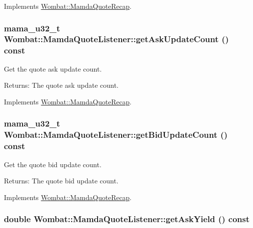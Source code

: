 Implements \hyperlink{classWombat_1_1MamdaQuoteRecap_91a0dbca4e481e0e3179af813128fba9}{Wombat::Mamda\-Quote\-Recap}.\hypertarget{classWombat_1_1MamdaQuoteListener_f1cf490659772cef488d7207b3587958}{
\subsubsection[getAskUpdateCount]{\setlength{\rightskip}{0pt plus 5cm}mama\_\-u32\_\-t Wombat::Mamda\-Quote\-Listener::get\-Ask\-Update\-Count () const}}
\label{classWombat_1_1MamdaQuoteListener_f1cf490659772cef488d7207b3587958}


Get the quote ask update count. 

\begin{Desc}
\item[Returns:]The quote ask update count. \end{Desc}


Implements \hyperlink{classWombat_1_1MamdaQuoteRecap_99ae27dd8ca7ed8507afcc66cdfe0f1c}{Wombat::Mamda\-Quote\-Recap}.\hypertarget{classWombat_1_1MamdaQuoteListener_d9c60e9325eaaa4ae2b5af91201dfb3f}{
\subsubsection[getBidUpdateCount]{\setlength{\rightskip}{0pt plus 5cm}mama\_\-u32\_\-t Wombat::Mamda\-Quote\-Listener::get\-Bid\-Update\-Count () const}}
\label{classWombat_1_1MamdaQuoteListener_d9c60e9325eaaa4ae2b5af91201dfb3f}


Get the quote bid update count. 

\begin{Desc}
\item[Returns:]The quote bid update count. \end{Desc}


Implements \hyperlink{classWombat_1_1MamdaQuoteRecap_36e64c863a6c89641b58451c2792744b}{Wombat::Mamda\-Quote\-Recap}.\hypertarget{classWombat_1_1MamdaQuoteListener_49a6a64974327a037d1470cf433d93e0}{
\subsubsection[getAskYield]{\setlength{\rightskip}{0pt plus 5cm}double Wombat::Mamda\-Quote\-Listener::get\-Ask\-Yield () const}}
\label{classWombat_1_1MamdaQuoteListener_49a6a64974327a037d1470cf433d93e0}


